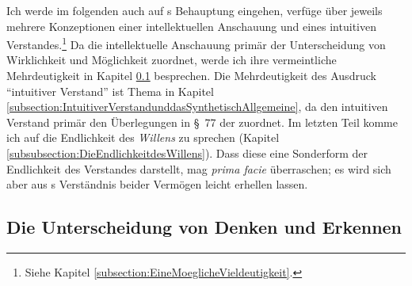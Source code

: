 Ich werde im folgenden auch auf
s Behauptung eingehen,
 verfüge über jeweils mehrere Konzeptionen einer
intellektuellen Anschauung und eines intuitiven Verstandes.\footnote{Siehe
Kapitel \ref{subsection:EineMoeglicheVieldeutigkeit}.} Da
 die intellektuelle Anschauung
primär der Unterscheidung von Wirklichkeit und Möglichkeit zuordnet, werde ich
ihre vermeintliche Mehrdeutigkeit in Kapitel
\ref{subsubsection:UnterscheidungvonDenkenundErkennen} besprechen. Die
Mehrdeutigkeit des Ausdruck \enquote{intuitiver Verstand} ist Thema in Kapitel
\ref{subsection:IntuitiverVerstandunddasSynthetischAllgemeine}, da
 den intuitiven Verstand
primär den Überlegungen in \S~77 der  zuordnet.
Im letzten Teil komme ich auf die Endlichkeit des \emph{Willens} zu sprechen
(Kapitel \ref{subsubsection:DieEndlichkeitdesWillens}). Dass diese eine
Sonderform der Endlichkeit des Verstandes darstellt, mag \emph{prima facie}
überraschen; es wird sich aber aus s Verständnis beider
Vermögen leicht erhellen lassen.

\subsection{Die Unterscheidung von Denken und
Erkennen}\label{subsubsection:UnterscheidungvonDenkenundErkennen}

